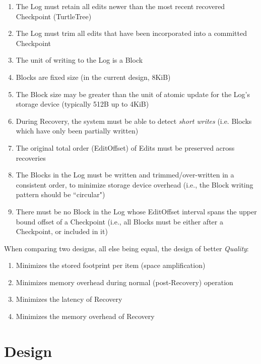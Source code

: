 \documentclass[11pt]{article}
\begin{document}
\begin{enumerate}
	\item[R1.] The Log must retain all edits newer than the most
          recent recovered Checkpoint (TurtleTree)
	\item[R2.] The Log must trim all edits that have been
          incorporated into a committed Checkpoint
	\item[R3.] The unit of writing to the Log is a Block
	\item[R4.] Blocks are fixed size (in the current design, 8KiB)
	\item[R5.] The Block size may be greater than the unit of
          atomic update for the Log's storage device (typically 512B
          up to 4KiB)
	\item[R6.] During Recovery, the system must be able to detect
          \textit{short writes} (i.e. Blocks which have only been
          partially written)
	\item[R7.] The original total order (EditOffset) of Edits must
          be preserved across recoveries
	\item[R8.] The Blocks in the Log must be written and
          trimmed/over-written in a consistent order, to minimize
          storage device overhead (i.e., the Block writing pattern
          should be ``circular")
	\item[R9.] There must be no Block in the Log whose EditOffset
          interval spans the upper bound offset of a Checkpoint (i.e.,
          all Blocks must be either after a Checkpoint, or included in
          it)
\end{enumerate}

When comparing two designs, all else being equal, the design of better
\textit{Quality}:

\begin{enumerate}
	\item[Q1.] Minimizes the stored footprint per item (space amplification)
	\item[Q2.] Minimizes memory overhead during normal (post-Recovery) operation
	\item[Q3.] Minimizes the latency of Recovery
	\item[Q4.] Minimizes the memory overhead of Recovery
\end{enumerate}

\section{Design}
\end{document}
